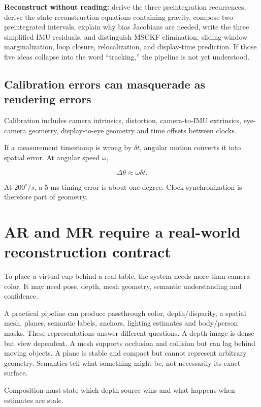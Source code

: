 \textbf{Reconstruct without reading:} derive the three preintegration recurrences, derive the state reconstruction equations containing gravity, compose two preintegrated intervals, explain why bias Jacobians are needed, write the three simplified IMU residuals, and distinguish MSCKF elimination, sliding-window marginalization, loop closure, relocalization, and display-time prediction. If those five ideas collapse into the word ``tracking,'' the pipeline is not yet understood.

\subsection{Calibration errors can masquerade as rendering errors}\label{04-visual-computing-ii-ch035-calibration-errors-can-masquerade-as-rendering-errors}

Calibration includes camera intrinsics, distortion, camera-to-IMU extrinsics, eye-camera geometry, display-to-eye geometry and time offsets between clocks.

If a measurement timestamp is wrong by \(\delta t\), angular motion converts it into spatial error. At angular speed \(\omega\),

\[
\Delta\theta\approx \omega\delta t.
\]

At \(200^\circ/s\), a 5 ms timing error is about one degree. Clock synchronization is therefore part of geometry.

\section{AR and MR require a real-world reconstruction contract}\label{04-visual-computing-ii-ch035-ar-and-mr-require-a-real-world-reconstruction-contract}

To place a virtual cup behind a real table, the system needs more than camera color. It may need pose, depth, mesh geometry, semantic understanding and confidence.

A practical pipeline can produce passthrough color, depth/disparity, a spatial mesh, planes, semantic labels, anchors, lighting estimates and body/person masks. These representations answer different questions. A depth image is dense but view dependent. A mesh supports occlusion and collision but can lag behind moving objects. A plane is stable and compact but cannot represent arbitrary geometry. Semantics tell what something might be, not necessarily its exact surface.

Composition must state which depth source wins and what happens when estimates are stale.

